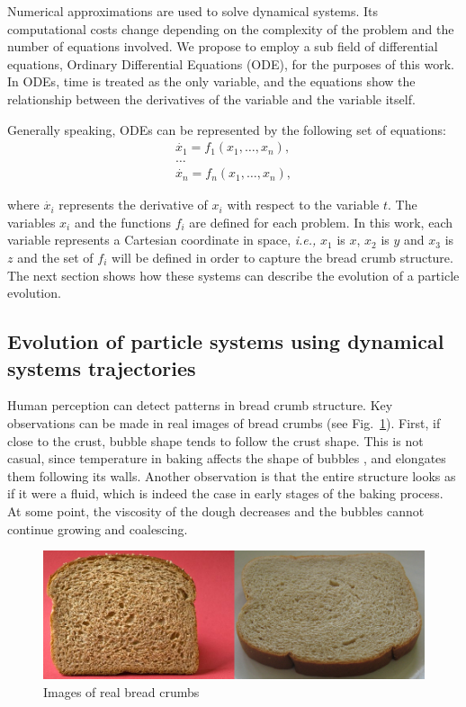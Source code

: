 \documentclass[oneside,a4paper,english,links]{amca}
\begin{document}
Numerical approximations are used to solve dynamical systems. Its computational costs change depending on the complexity of the problem and the number of equations involved. We propose to employ a sub field of differential equations, Ordinary Differential Equations (ODE), for the purposes of this work. In ODEs, time is treated as the only variable, and the equations show the relationship between the derivatives of the variable and the variable itself. 

Generally speaking, ODEs can be represented by the following set of equations:
\begin{equation} \label{eq:simple}  
  \begin{aligned}
    \dot{x_{1}} = f_{1}(x_{1},\ldots,x_{n}),\\
    \ldots\\
    \dot{x_{n}} = f_{n}(x_{1},\ldots,x_{n}),
  \end{aligned}
\end{equation}

where $\dot{x_{i}}$ represents the derivative of $x_{i}$ with respect
to the variable $t$. The variables $x_{i}$ and the functions $f_{i}$
are defined for each problem. In this work, each variable represents a
Cartesian coordinate in space, {\em i.e.,} $x_{1}$ is $x$, $x_{2}$ is
$y$ and $x_{3}$ is $z$ and the set of $f_{i}$ will be defined in order
to capture the bread crumb structure. The next section shows how these
systems can describe the evolution of a particle evolution.

\subsection{Evolution of particle systems using dynamical systems trajectories}

Human perception can detect patterns in bread crumb structure. Key
observations can be made in real images of bread crumbs (see
Fig.~\ref{fg:fig2}). First, if close to the crust, bubble shape tends
to follow the crust shape. This is not casual, since temperature in
baking affects the shape of bubbles \citep{Scanlon2001}, and elongates
them following its walls. Another observation is that the entire
structure looks as if it were a fluid, which is indeed the case in
early stages of the baking process. At some point, the viscosity
of the dough decreases and the bubbles cannot continue growing and
coalescing.

\begin{figure}[htb!]
  \centerline{\includegraphics[scale=0.45]{fig2}}
  \caption{Images of real bread crumbs}
  \label{fg:fig2}
\end{figure}
\end{document}
